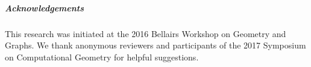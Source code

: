 \documentclass[a4paper]{article}
\newcommand{\comment}[1]{{\color{blue} #1}}
\theoremstyle{plain}
\theoremstyle{definition}
\theoremstyle{remark}
\begin{document}

 


%





 


\subparagraph*{Acknowledgements}
This research was initiated at the 2016 Bellairs Workshop on Geometry and Graphs. We thank anonymous reviewers and participants of the 2017 Symposium on Computational Geometry for helpful suggestions.


\newpage
\end{document}

